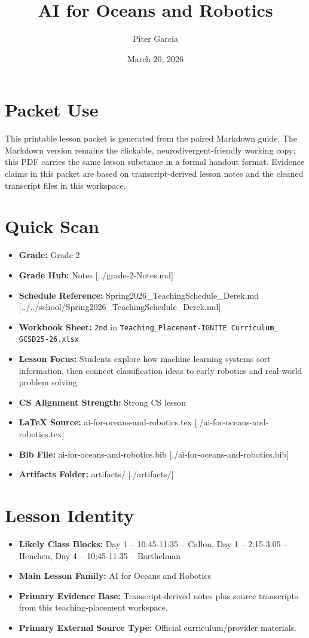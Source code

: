 \documentclass[11pt]{article}
\title{AI for Oceans and Robotics}
\author{Piter Garcia}
\date{March 20, 2026}
\begin{document}
\maketitle
\section*{Packet Use}
This printable lesson packet is generated from the paired Markdown guide. The Markdown version remains the clickable, neurodivergent-friendly working copy; this PDF carries the same lesson substance in a formal handout format. Evidence claims in this packet are based on transcript-derived lesson notes and the cleaned transcript files in this workspace.

\section*{Quick Scan}
\begin{itemize}[leftmargin=*]
\item \textbf{Grade:} Grade 2
\item \textbf{Grade Hub:} Notes [../grade-2-Notes.md]
\item \textbf{Schedule Reference:} Spring2026\_TeachingSchedule\_Derek.md [../../school/Spring2026\_TeachingSchedule\_Derek.md]
\item \textbf{Workbook Sheet:} \texttt{2nd} in \texttt{Teaching\_Placement-IGNITE Curriculum\_ GCSD25-26.xlsx}
\item \textbf{Lesson Focus:} Students explore how machine learning systems sort information, then connect classification ideas to early robotics and real-world problem solving.
\item \textbf{CS Alignment Strength:} Strong CS lesson
\item \textbf{LaTeX Source:} ai-for-oceans-and-robotics.tex [./ai-for-oceans-and-robotics.tex]
\item \textbf{Bib File:} ai-for-oceans-and-robotics.bib [./ai-for-oceans-and-robotics.bib]
\item \textbf{Artifacts Folder:} artifacts/ [./artifacts/]
\end{itemize}

\section*{Lesson Identity}
\begin{itemize}[leftmargin=*]
\item \textbf{Likely Class Blocks:} Day 1 -- 10:45-11:35 -- Callon, Day 1 -- 2:15-3:05 -- Henchen, Day 4 -- 10:45-11:35 -- Barthelman
\item \textbf{Main Lesson Family:} AI for Oceans and Robotics
\item \textbf{Primary Evidence Base:} Transcript-derived notes plus source transcripts from this teaching-placement workspace.
\item \textbf{Primary External Source Type:} Official curriculum/provider materials.
\end{itemize}
\end{document}
